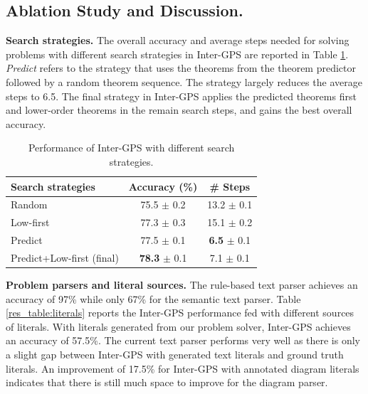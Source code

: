 \documentclass[11pt,a4paper]{article}
\begin{document}
\subsection{Ablation Study and Discussion.} \label{sec:discussion}

\noindent \textbf{Search strategies.} The overall accuracy and average steps needed for solving problems with different search strategies in Inter-GPS are reported in Table \ref{res_table:strategies}. \textit{Predict} refers to the strategy that uses the theorems from the theorem predictor followed by a random theorem sequence. The strategy largely reduces the average steps to 6.5. The final strategy in Inter-GPS applies the predicted theorems first and lower-order theorems in the remain search steps, and gains the best overall accuracy.

\begin{table}[ht]
\centering 
\setlength{\tabcolsep}{3pt}
\small 
\begin{tabular}{l|c|c}
	\hline
	 \textbf{Search strategies} & Accuracy (\%) & \# Steps  \\
	 \hline
	 Random & 75.5 $\pm$ 0.2 & 13.2 $\pm$ 0.1 \\
	 \hline
	 Low-first & 77.3 $\pm$ 0.3 & 15.1 $\pm$ 0.2 \\
	 \hline
	 Predict & 77.5 $\pm$ 0.1 & \textbf{6.5} $\pm$ 0.1 \\
	 \hline
	 Predict+Low-first (final) & \textbf{78.3} $\pm$ 0.1 & 7.1 $\pm$ 0.1 \\
	\hline
\end{tabular}
\caption{Performance of Inter-GPS with different search strategies.}
\label{res_table:strategies}
\end{table}

\noindent \textbf{Problem parsers and literal sources.} The rule-based text parser achieves an accuracy of 97\% while only 67\% for the semantic text parser. Table \ref{res_table:literals} reports the Inter-GPS performance fed with different sources of literals. With literals generated from our problem solver, Inter-GPS achieves an accuracy of 57.5\%.  The current text parser performs very well as there is only a slight gap between Inter-GPS with generated text literals and ground truth literals. An improvement of 17.5\% for Inter-GPS with annotated diagram literals indicates that there is still much space to improve for the diagram parser.
\end{document}

